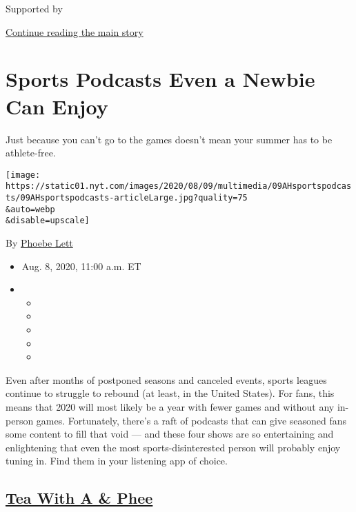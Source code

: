 Supported by

\protect\hyperlink{after-sponsor}{Continue reading the main story}

\hypertarget{sports-podcasts-even-a-newbie-can-enjoy}{%
\section{Sports Podcasts Even a Newbie Can
Enjoy}\label{sports-podcasts-even-a-newbie-can-enjoy}}

Just because you can't go to the games doesn't mean your summer has to
be athlete-free.

\texttt{[image: https://static01.nyt.com/images/2020/08/09/multimedia/09AHsportspodcasts/09AHsportspodcasts-articleLarge.jpg?quality=75\\\&auto=webp\\\&disable=upscale]}

By \href{https://www.nytimes.com/by/phoebe-lett}{Phoebe Lett}

\begin{itemize}
\item
  Aug. 8, 2020, 11:00 a.m. ET
\item
  \begin{itemize}
  \item
  \item
  \item
  \item
  \item
  \end{itemize}
\end{itemize}

Even after months of postponed seasons and canceled events, sports
leagues continue to struggle to rebound (at least, in the United
States). For fans, this means that 2020 will most likely be a year with
fewer games and without any in-person games. Fortunately, there's a raft
of podcasts that can give seasoned fans some content to fill that void
--- and these four shows are so entertaining and enlightening that even
the most sports-disinterested person will probably enjoy tuning in. Find
them in your listening app of choice.

\hypertarget{tea-with-a--phee}{%
\subsection{\texorpdfstring{\href{https://teawithaandphee.libsyn.com/website}{Tea
With A \& Phee}}{Tea With A \& Phee}}\label{tea-with-a--phee}}

